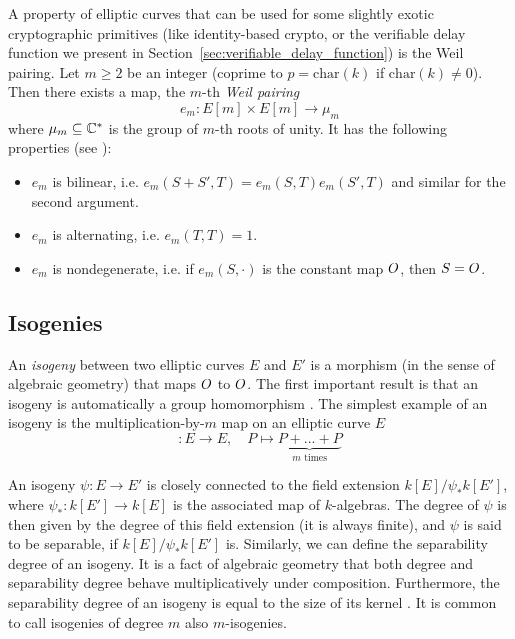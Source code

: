 A property of elliptic curves that can be used for some slightly exotic cryptographic primitives (like identity-based crypto, or the verifiable delay function we present in Section~\ref{sec:verifiable_delay_function}) is the Weil pairing.
Let $m \geq 2$ be an integer (coprime to $p = \mathrm{char}(k)$ if $\mathrm{char}(k) \neq 0$).
Then there exists a map, the $m$-th \emph{Weil pairing}
\begin{equation*}
    e_m: E[m] \times E[m] \to \mu_m
\end{equation*}
where $\mu_m \subseteq \mathbb{C}^*$ is the group of $m$-th roots of unity.
It has the following properties (see \cite[Prop.~III.8.1]{arithmetic_elliptic_curves}):
\begin{itemize}
    \item $e_m$ is bilinear, i.e. $e_m(S + S', T) = e_m(S, T)e_m(S', T)$ and similar for the second argument.
    \item $e_m$ is alternating, i.e. $e_m(T, T) = 1$.
    \item $e_m$ is nondegenerate, i.e. if $e_m(S, \cdot)$ is the constant map $O$, then $S = O$.
\end{itemize}

\subsection{Isogenies}
An \emph{isogeny} between two elliptic curves $E$ and $E'$ is a morphism (in the sense of algebraic geometry) that maps $O$ to $O$.
The first important result is that an isogeny is automatically a group homomorphism \cite[Thm~III.4.8]{arithmetic_elliptic_curves}.
The simplest example of an isogeny is the multiplication-by-$m$ map on an elliptic curve $E$
\begin{equation*}
    [m]: E \to E, \quad P \mapsto \underbrace{P + ... + P}_{\text{$m$ times}}
\end{equation*}

An isogeny $\psi: E \to E'$ is closely connected to the field extension $k[E]/\psi_*k[E']$, where $\psi_*: k[E'] \to k[E]$ is the associated map of $k$-algebras.
The degree of $\psi$ is then given by the degree of this field extension (it is always finite), and $\psi$ is said to be separable, if $k[E]/\psi_*k[E']$ is.
Similarly, we can define the separability degree of an isogeny.
It is a fact of algebraic geometry that both degree and separability degree behave multiplicatively under composition.
Furthermore, the separability degree of an isogeny is equal to the size of its kernel \cite[Thm~III.4.10]{arithmetic_elliptic_curves}.
It is common to call isogenies of degree $m$ also $m$-isogenies.

